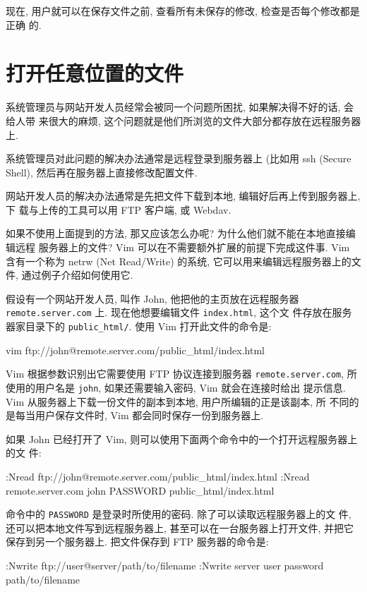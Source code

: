 现在, 用户就可以在保存文件之前, 查看所有未保存的修改, 检查是否每个修改都是正确
的.

\section{打开任意位置的文件}
\label{sec:open_files_anywhere}

系统管理员与网站开发人员经常会被同一个问题所困扰, 如果解决得不好的话, 会给人带
来很大的麻烦, 这个问题就是他们所浏览的文件大部分都存放在远程服务器上.

系统管理员对此问题的解决办法通常是远程登录到服务器上 (比如用 ssh (Secure
Shell), 然后再在服务器上直接修改配置文件.

网站开发人员的解决办法通常是先把文件下载到本地, 编辑好后再上传到服务器上, 下
载与上传的工具可以用 FTP 客户端, 或 Webdav.

如果不使用上面提到的方法, 那又应该怎么办呢? 为什么他们就不能在本地直接编辑远程
服务器上的文件? Vim 可以在不需要额外扩展的前提下完成这件事. Vim 含有一个称为
netrw (Net Read/Write) 的系统, 它可以用来编辑远程服务器上的文件,
通过例子介绍如何使用它.

假设有一个网站开发人员, 叫作 John, 他把他的主页放在远程服务器
\texttt{remote.server.com} 上. 现在他想要编辑文件 \texttt{index.html}, 这个文
件存放在服务器家目录下的 \verb'public_html/'. 使用 Vim 打开此文件的命令是:
\begin{vimcode}
vim ftp://john@remote.server.com/public_html/index.html
\end{vimcode}

Vim 根据参数识别出它需要使用 FTP 协议连接到服务器 \texttt{remote.server.com},
所使用的用户名是 \texttt{john}, 如果还需要输入密码, Vim 就会在连接时给出
提示信息. Vim 从服务器上下载一份文件的副本到本地, 用户所编辑的正是该副本, 所
不同的是每当用户保存文件时, Vim 都会同时保存一份到服务器上.

如果 John 已经打开了 Vim, 则可以使用下面两个命令中的一个打开远程服务器上的文
件:
\begin{vimcode}
:Nread ftp://john@remote.server.com/public_html/index.html
:Nread remote.server.com john PASSWORD public_html/index.html
\end{vimcode}
命令中的 \texttt{PASSWORD} 是登录时所使用的密码. 除了可以读取远程服务器上的文
件, 还可以把本地文件写到远程服务器上, 甚至可以在一台服务器上打开文件, 并把它
保存到另一个服务器上. 把文件保存到 FTP 服务器的命令是:
\begin{vimcode}
:Nwrite ftp://user@server/path/to/filename
:Nwrite server user password path/to/filename
\end{vimcode}

